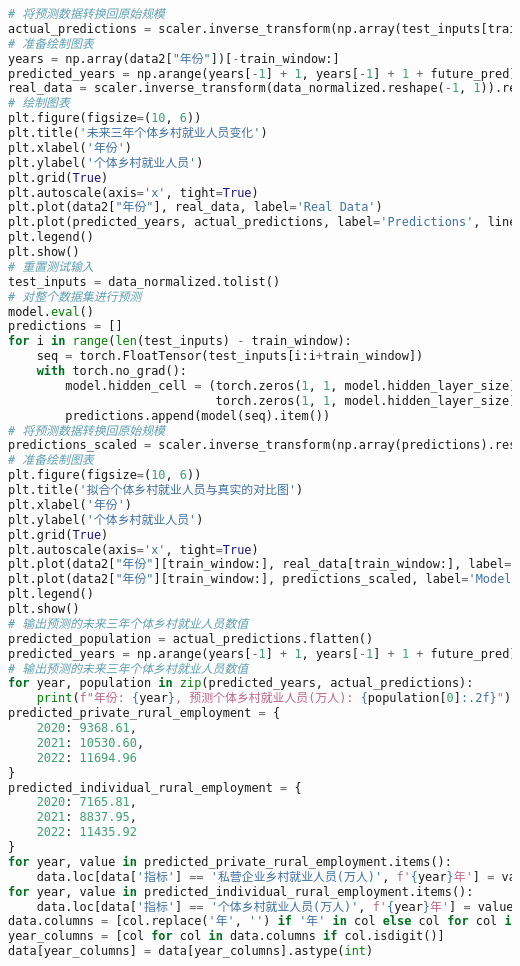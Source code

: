\begin{lstlisting}[language=python,caption={就业前景}]
# 将预测数据转换回原始规模
actual_predictions = scaler.inverse_transform(np.array(test_inputs[train_window:] ).reshape(-1, 1))
# 准备绘制图表
years = np.array(data2["年份"])[-train_window:]
predicted_years = np.arange(years[-1] + 1, years[-1] + 1 + future_pred)
real_data = scaler.inverse_transform(data_normalized.reshape(-1, 1)).reshape(-1)
# 绘制图表
plt.figure(figsize=(10, 6))
plt.title('未来三年个体乡村就业人员变化')
plt.xlabel('年份')
plt.ylabel('个体乡村就业人员')
plt.grid(True)
plt.autoscale(axis='x', tight=True)
plt.plot(data2["年份"], real_data, label='Real Data')
plt.plot(predicted_years, actual_predictions, label='Predictions', linestyle='--')
plt.legend()
plt.show()
# 重置测试输入
test_inputs = data_normalized.tolist()
# 对整个数据集进行预测
model.eval()
predictions = []
for i in range(len(test_inputs) - train_window):
    seq = torch.FloatTensor(test_inputs[i:i+train_window])
    with torch.no_grad():
        model.hidden_cell = (torch.zeros(1, 1, model.hidden_layer_size),
                             torch.zeros(1, 1, model.hidden_layer_size))
        predictions.append(model(seq).item())
# 将预测数据转换回原始规模
predictions_scaled = scaler.inverse_transform(np.array(predictions).reshape(-1, 1))
# 准备绘制图表
plt.figure(figsize=(10, 6))
plt.title('拟合个体乡村就业人员与真实的对比图')
plt.xlabel('年份')
plt.ylabel('个体乡村就业人员')
plt.grid(True)
plt.autoscale(axis='x', tight=True)
plt.plot(data2["年份"][train_window:], real_data[train_window:], label='Real Data')
plt.plot(data2["年份"][train_window:], predictions_scaled, label='Model Fit', linestyle='--')
plt.legend()
plt.show()
# 输出预测的未来三年个体乡村就业人员数值
predicted_population = actual_predictions.flatten()
predicted_years = np.arange(years[-1] + 1, years[-1] + 1 + future_pred)
# 输出预测的未来三年个体乡村就业人员数值
for year, population in zip(predicted_years, actual_predictions):
    print(f"年份: {year}, 预测个体乡村就业人员(万人): {population[0]:.2f}")
predicted_private_rural_employment = {
    2020: 9368.61,
    2021: 10530.60,
    2022: 11694.96
}
predicted_individual_rural_employment = {
    2020: 7165.81,
    2021: 8837.95,
    2022: 11435.92
}
for year, value in predicted_private_rural_employment.items():
    data.loc[data['指标'] == '私营企业乡村就业人员(万人)', f'{year}年'] = value
for year, value in predicted_individual_rural_employment.items():
    data.loc[data['指标'] == '个体乡村就业人员(万人)', f'{year}年'] = value
data.columns = [col.replace('年', '') if '年' in col else col for col in data.columns]
year_columns = [col for col in data.columns if col.isdigit()]
data[year_columns] = data[year_columns].astype(int)


\end{lstlisting}
